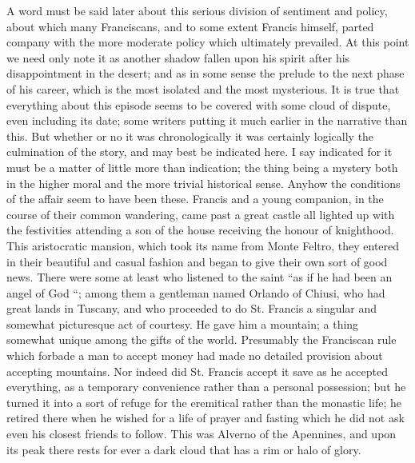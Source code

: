 \documentclass{book}
\begin{document}
A word must be said later about this serious division of sentiment and policy, about which many Franciscans, and to some extent Francis himself, parted company with the more moderate policy which ultimately prevailed. At this point we need only note it as another shadow fallen upon his spirit after his disappointment in the desert; and as in some sense the prelude to the next phase of his career, which is the most isolated and the most mysterious. It is true that everything about this episode seems to be covered with some cloud of dispute, even including its date; some writers putting it much earlier in the narrative than this. But whether or no it was chronologically it was certainly logically the culmination of the story, and may best be indicated here. I say indicated for it must be a matter of little more than indication; the thing being a mystery both in the higher moral and the more trivial historical sense. Anyhow the conditions of the affair seem to have been these. Francis and a young companion, in the course of their common wandering, came past a great castle all lighted up with the festivities attending a son of the house receiving the honour of knighthood. This aristocratic mansion, which took its name from Monte Feltro, they entered in their beautiful and casual fashion and began to give their own sort of good news. There were some at least who listened to the saint “as if he had been an angel of God “; among them a gentleman named Orlando of Chiusi, who had great lands in Tuscany, and who proceeded to do St. Francis a singular and somewhat picturesque act of courtesy. He gave him a mountain; a thing somewhat unique among the gifts of the world. Presumably the Franciscan rule which forbade a man to accept money had made no detailed provision about accepting mountains. Nor indeed did St. Francis accept it save as he accepted everything, as a temporary convenience rather than a personal possession; but he turned it into a sort of refuge for the eremitical rather than the monastic life; he retired there when he wished for a life of prayer and fasting which he did not ask even his closest friends to follow. This was Alverno of the Apennines, and upon its peak there rests for ever a dark cloud that has a rim or halo of glory.
\end{document}

